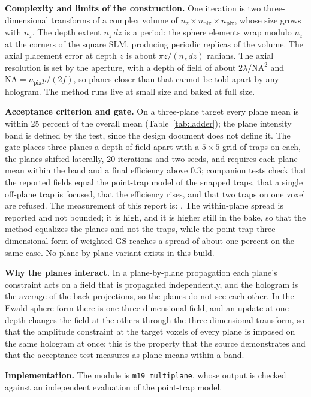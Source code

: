 \textbf{Complexity and limits of the construction.} One iteration is two three-dimensional transforms of a complex volume of $n_z\times n_{\mathrm{pix}}\times n_{\mathrm{pix}}$, whose size grows with $n_z$. The depth extent $n_z\,dz$ is a period: the sphere elements wrap modulo $n_z$ at the corners of the square SLM, producing periodic replicas of the volume. The axial placement error at depth $z$ is about $\pi z/(n_z\,dz)$ radians. The axial resolution is set by the aperture, with a depth of field of about $2\lambda/\mathrm{NA}^2$ and $\mathrm{NA}=n_{\mathrm{pix}}p/(2f)$, so planes closer than that cannot be told apart by any hologram. The method runs live at small size and baked at full size.

\textbf{Acceptance criterion and gate.} On a three-plane target every plane mean is within 25 percent of the overall mean (Table~\ref{tab:ladder}); the plane intensity band is defined by the test, since the design document does not define it. The gate places three planes a depth of field apart with a $5\times5$ grid of traps on each, the planes shifted laterally, 20 iterations and two seeds, and requires each plane mean within the band and a final efficiency above 0.3; companion tests check that the reported fields equal the point-trap model of the snapped traps, that a single off-plane trap is focused, that the efficiency rises, and that two traps on one voxel are refused. The measurement of this report is: . The within-plane spread is reported and not bounded; it is high, and it is higher still in the bake, so that the method equalizes the planes and not the traps, while the point-trap three-dimensional form of weighted GS reaches a spread of about one percent on the same case. No plane-by-plane variant exists in this build.

\textbf{Why the planes interact.} In a plane-by-plane propagation each plane's constraint acts on a field that is propagated independently, and the hologram is the average of the back-projections, so the planes do not see each other. In the Ewald-sphere form there is one three-dimensional field, and an update at one depth changes the field at the others through the three-dimensional transform, so that the amplitude constraint at the target voxels of every plane is imposed on the same hologram at once; this is the property that the source demonstrates and that the acceptance test measures as plane means within a band.

\textbf{Implementation.} The module is \texttt{m19\_multiplane}, whose output is checked against an independent evaluation of the point-trap model.
